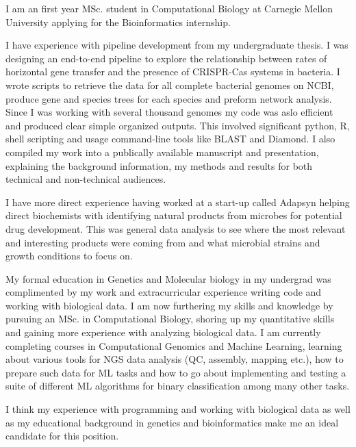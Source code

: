 \documentclass[11pt, a4paper]{./Awesome-CV/awesome-cv}
\begin{document}
\vspace*{\fill}
\makelettertitle %

\begin{cvletter}

    I am an first year MSc. student in Computational Biology at Carnegie Mellon University
applying for the Bioinformatics internship.

I have experience with pipeline development from my undergraduate thesis.
I was designing an end-to-end pipeline to explore the relationship between rates of horizontal gene transfer and the presence of CRISPR-Cas systems in bacteria. I wrote scripts to retrieve the data for all complete bacterial genomes on NCBI, produce gene and species trees for each species and preform network analysis. Since I was working with several thousand genomes my code was aslo efficient and produced clear simple organized outputs. This involved significant python, R, shell scripting and usage command-line tools like BLAST and Diamond. I also compiled my work into a publically available manuscript and presentation, explaining the background information, my methods and results for both technical and non-technical audiences.

I have more direct experience having worked at a start-up called Adapsyn helping direct biochemists with identifying natural products from microbes for potential drug development. This was general data analysis to see where the most relevant and interesting products were coming from and what microbial strains and growth conditions to focus on.

My formal education in Genetics and Molecular biology in my undergrad was complimented by my work and extracurricular experience writing code and working with biological data. I am now furthering my skills and knowledge by pursuing an MSc. in Computational Biology, shoring up my quantitative skills and gaining more experience with analyzing biological data. I am currently completing courses in Computational Genomics and Machine Learning, learning about various tools for NGS data analysis (QC, assembly, mapping etc.), how to prepare such data for ML tasks and how to go about implementing and testing a suite of different ML algorithms for binary classification among many other tasks.

I think my experience with programming and working with biological data as well as my educational background in genetics and bioinformatics make me an ideal candidate for this position.

\end{cvletter}
\makeletterclosing
\vspace*{\fill}
\end{document}

